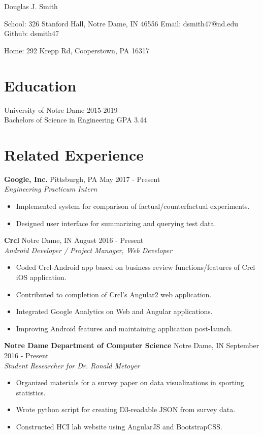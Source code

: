 \documentclass[10pt]{article}
\begin{document}
  \centerline{
    Douglas J. Smith
  }
  \centerline{
    School: 326 Stanford Hall, Notre Dame, IN 46556
    Email: dsmith47@nd.edu
    Github: dsmith47
  }
  \centerline{
    Home: 292 Krepp Rd, Cooperstown, PA 16317
  }

  \section*{Education}
    University of Notre Dame
    \hfill
    2015-2019
    \\
    Bachelors of Science in Engineering
    \hfill
    GPA 3.44
    \\
  \section*{Related Experience}
    \textbf{Google, Inc.}
    \hfill
    Pittsburgh, PA
    \hfill
    May 2017 - Present
    \\
    \textit{Engineering Practicum Intern}
    \begin{itemize}
      \item Implemented system for comparison of factual/counterfactual experiments.
      \item Designed user interface for summarizing and querying test data. 
    \end{itemize}
  
    \textbf{Crcl}
    \hfill
    Notre Dame, IN
    \hfill
    August 2016 - Present
    \\
    \textit{Android Developer / Project Manager, Web Developer}
    \begin{itemize}
      \item Coded Crcl-Android app based on business review functions/features of Crcl iOS application.
      \item Contributed to completion of Crcl's Angular2 web application.
      \item Integrated Google Analytics on Web and Angular applications.
      \item Improving Android features and maintaining application post-launch.
    \end{itemize}
    
    \textbf{Notre Dame Department of Computer Science}
    \hfill
    Notre Dame, IN
    \hfill
    September 2016 - Present
    \\
    \textit{Student Researcher for Dr. Ronald Metoyer}
    \begin{itemize}
      \item Organized materials for a survey paper on data visualizations in sporting statistics.
      \item Wrote python script for creating D3-readable JSON from survey data.
      \item Constructed HCI lab website using AngularJS and BootstrapCSS.
    \end{itemize}
    
\end{document}
